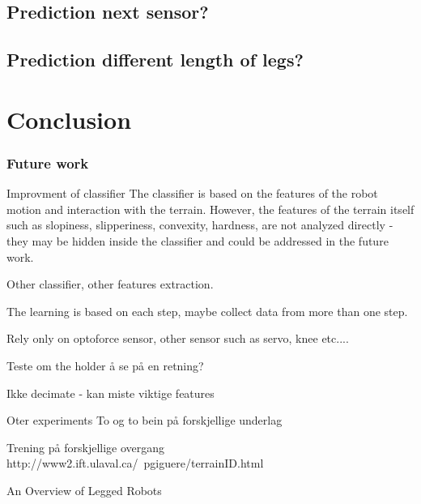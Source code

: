 \documentclass[USenglish]{ifimaster}  %
\begin{document}
\section{Prediction next sensor?}


\section{Prediction different length of legs?}

\chapter{Conclusion}



\subsection{Future work}
Improvment of classifier
The classifier is based on the features of the robot motion and interaction with the terrain. However, the features of the terrain itself such as slopiness, slipperiness, convexity, hardness, are not analyzed directly - they may be hidden inside the classifier and could be addressed in the future work.

Other classifier, other features extraction.

The learning is based on each step, maybe collect data from more than one step.

Rely only on optoforce sensor, other sensor such as servo, knee etc....

Teste om the holder å se på en retning?

Ikke decimate - kan miste viktige features

Oter experiments
To og to bein på forskjellige underlag

Trening på forskjellige overgang
http://www2.ift.ulaval.ca/~pgiguere/terrainID.html


An Overview of Legged Robots

\backmatter{}


\end{document}
